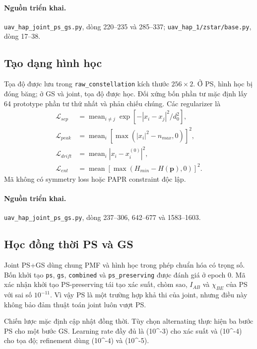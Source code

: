 \paragraph{Nguồn triển khai.} \texttt{uav\_hap\_joint\_ps\_gs.py}, dòng 220--235 và 285--337; \texttt{uav\_hap\_1/zstar/base.py}, dòng 17--38.

\subsection{Tạo dạng hình học}

Tọa độ được lưu trong \texttt{raw\_constellation} kích thước \(256\times2\). Ở PS, hình học bị đóng băng; ở GS và joint, tọa độ được học. Đối xứng bốn phần tư mặc định lấy 64 prototype phần tư thứ nhất và phản chiếu chúng. Các regularizer là
\begin{align}
\mathcal L_{sep}&=\operatorname{mean}_{i\ne j}
\exp[-|x_i-x_j|^2/d_0^2],\\
\mathcal L_{peak}&=\operatorname{mean}_i[\max(|x_i|^2-n_{max},0)]^2,\\
\mathcal L_{drift}&=\operatorname{mean}_i|x_i-x_i^{(0)}|^2,\\
\mathcal L_{ent}&=\operatorname{mean}[\max(H_{min}-H(\mathbf p),0)]^2.
\end{align}
Mã không có symmetry loss hoặc PAPR constraint độc lập.

\paragraph{Nguồn triển khai.} \texttt{uav\_hap\_joint\_ps\_gs.py}, dòng 237--306, 642--677 và 1583--1603.

\subsection{Học đồng thời PS và GS}

Joint PS+GS dùng chung PMF và hình học trong phép chuẩn hóa có trọng số. Bốn khởi tạo \texttt{ps}, \texttt{gs}, \texttt{combined} và \texttt{ps\_preserving} được đánh giá ở epoch 0. Mã xác nhận khởi tạo PS-preserving tái tạo xác suất, chòm sao, \(I_{AB}\) và \(\chi_{BE}\) của PS với sai số \(10^{-11}\). Vì vậy PS là một trường hợp khả thi của joint, nhưng điều này không bảo đảm thuật toán joint luôn vượt PS.

Chiến lược mặc định cập nhật đồng thời. Tùy chọn alternating thực hiện ba bước PS cho một bước GS. Learning rate đầy đủ là (10^{-3}) cho xác suất và (10^{-4}) cho tọa độ; refinement dùng (10^{-4}) và (10^{-5}).

